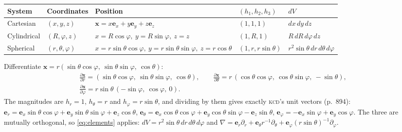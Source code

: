 \documentclass[11pt,letterpaper]{article}
\numberwithin{equation}{section}
\newcommand{\xx}{\mathbf{x}}
\newcommand{\e}[1]{\mathbf{e}_{#1}}
\newcommand{\pd}[2]{\frac{\partial #1}{\partial #2}}
\newcommand{\Kundu}{\textnormal{\textsc{kcd}}}   %
\begin{document}
\begin{center}
\small
\renewcommand{\arraystretch}{1.3}
\begin{tabular}{@{}lllll@{}}
\toprule
System & Coordinates & Position & $(h_1,h_2,h_3)$ & $dV$ \\ \midrule
Cartesian & $(x,y,z)$ & $\xx=x\e{x}+y\e{y}+z\e{z}$ & $(1,1,1)$ & $dx\,dy\,dz$ \\
Cylindrical & $(R,\varphi,z)$ & $x=R\cos\varphi,\ y=R\sin\varphi,\ z=z$ & $(1,R,1)$ & $R\,dR\,d\varphi\,dz$ \\
Spherical & $(r,\theta,\varphi)$ & $x=r\sin\theta\cos\varphi,\ y=r\sin\theta\sin\varphi,\ z=r\cos\theta$ & $(1,r,r\sin\theta)$ & $r^2\sin\theta\,dr\,d\theta\,d\varphi$ \\
\bottomrule
\end{tabular}
\end{center}

\begin{worked}\label{we:sphscale}
Differentiate $\xx=r(\sin\theta\cos\varphi,\ \sin\theta\sin\varphi,\ \cos\theta)$:
\begin{gather*}
\pd{\xx}{r}=(\sin\theta\cos\varphi,\ \sin\theta\sin\varphi,\ \cos\theta),\qquad
\pd{\xx}{\theta}=r\,(\cos\theta\cos\varphi,\ \cos\theta\sin\varphi,\ -\sin\theta),\\
\pd{\xx}{\varphi}=r\sin\theta\,(-\sin\varphi,\ \cos\varphi,\ 0).
\end{gather*}
The magnitudes are $h_r=1$, $h_\theta=r$ and $h_\varphi=r\sin\theta$, and dividing by them gives exactly \Kundu's unit
vectors (p.~894):
$\e{r}=\e{x}\sin\theta\cos\varphi+\e{y}\sin\theta\sin\varphi+\e{z}\cos\theta$,
$\e{\theta}=\e{x}\cos\theta\cos\varphi+\e{y}\cos\theta\sin\varphi-\e{z}\sin\theta$,
$\e{\varphi}=-\e{x}\sin\varphi+\e{y}\cos\varphi$. The three are mutually orthogonal, so \eqref{eq:elements} applies:
$dV=r^2\sin\theta\,dr\,d\theta\,d\varphi$ and $\nabla=\e{r}\partial_r+\e{\theta}r^{-1}\partial_\theta+\e{\varphi}(r\sin\theta)^{-1}\partial_\varphi$.
\end{worked}
\end{document}

